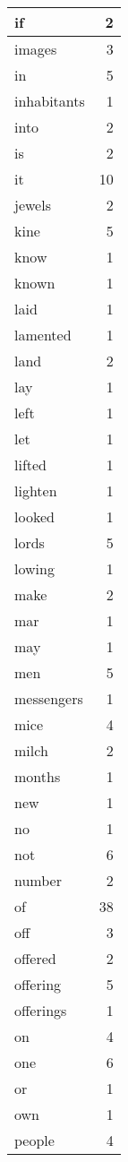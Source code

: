 \begin{center}
\begin{longtable}{l|r}
if & 2 \\ \hline
images & 3 \\ \hline
in & 5 \\ \hline
inhabitants & 1 \\ \hline
into & 2 \\ \hline
is & 2 \\ \hline
it & 10 \\ \hline
jewels & 2 \\ \hline
kine & 5 \\ \hline
know & 1 \\ \hline
known & 1 \\ \hline
laid & 1 \\ \hline
lamented & 1 \\ \hline
land & 2 \\ \hline
lay & 1 \\ \hline
left & 1 \\ \hline
let & 1 \\ \hline
lifted & 1 \\ \hline
lighten & 1 \\ \hline
looked & 1 \\ \hline
lords & 5 \\ \hline
lowing & 1 \\ \hline
make & 2 \\ \hline
mar & 1 \\ \hline
may & 1 \\ \hline
men & 5 \\ \hline
messengers & 1 \\ \hline
mice & 4 \\ \hline
milch & 2 \\ \hline
months & 1 \\ \hline
new & 1 \\ \hline
no & 1 \\ \hline
not & 6 \\ \hline
number & 2 \\ \hline
of & 38 \\ \hline
off & 3 \\ \hline
offered & 2 \\ \hline
offering & 5 \\ \hline
offerings & 1 \\ \hline
on & 4 \\ \hline
one & 6 \\ \hline
or & 1 \\ \hline
own & 1 \\ \hline
people & 4 \\ \hline

\end{longtable}
\end{center}
